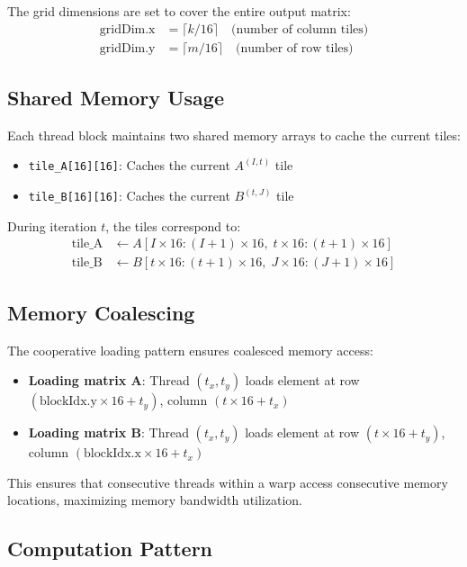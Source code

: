 \documentclass{amsbook}
\theoremstyle{definition}
\begin{document}
The grid dimensions are set to cover the entire output matrix:
\begin{align}
\text{gridDim.x} &= \lceil k/16 \rceil \quad \text{(number of column tiles)} \\
\text{gridDim.y} &= \lceil m/16 \rceil \quad \text{(number of row tiles)}
\end{align}

\subsection{Shared Memory Usage}

Each thread block maintains two shared memory arrays to cache the current tiles:
\begin{itemize}
\item \texttt{tile\_A[16][16]}: Caches the current $A^{(I,t)}$ tile
\item \texttt{tile\_B[16][16]}: Caches the current $B^{(t,J)}$ tile
\end{itemize}

During iteration $t$, the tiles correspond to:
\begin{align}
\text{tile\_A} &\gets A[I \times 16 : (I+1) \times 16, \; t \times 16 : (t+1) \times 16] \\
\text{tile\_B} &\gets B[t \times 16 : (t+1) \times 16, \; J \times 16 : (J+1) \times 16]
\end{align}

\subsection{Memory Coalescing}

The cooperative loading pattern ensures coalesced memory access:
\begin{itemize}
\item \textbf{Loading matrix A}: Thread $(t_x, t_y)$ loads element at row $(\text{blockIdx.y} \times 16 + t_y)$, column $(t \times 16 + t_x)$
\item \textbf{Loading matrix B}: Thread $(t_x, t_y)$ loads element at row $(t \times 16 + t_y)$, column $(\text{blockIdx.x} \times 16 + t_x)$
\end{itemize}

This ensures that consecutive threads within a warp access consecutive memory locations, maximizing memory bandwidth utilization.

\subsection{Computation Pattern}
\end{document}
